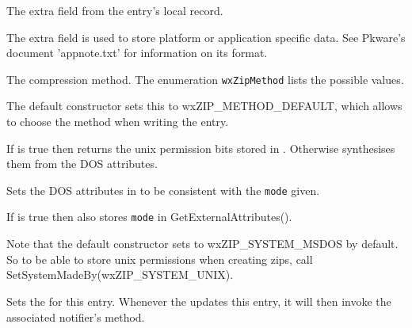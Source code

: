 


The extra field from the entry's local record.

The extra field is used to store platform or application specific
data. See Pkware's document 'appnote.txt' for information on its format.


\label{wxzipentrymethod}



The compression method. The enumeration {\tt wxZipMethod} lists the
possible values.

The default constructor sets this to wxZIP\_METHOD\_DEFAULT,
which allows  to
choose the method when writing the entry.


\label{wxzipentrymode}


If  is true then
returns the unix permission bits stored in
 .
Otherwise synthesises them from the DOS attributes.


Sets the DOS attributes
in 
to be consistent with the {\tt mode} given.

If  is true then also
stores {\tt mode} in GetExternalAttributes().

Note that the default constructor
sets  to 
wxZIP\_SYSTEM\_MSDOS by default. So to be able to store unix
permissions when creating zips, call SetSystemMadeBy(wxZIP\_SYSTEM\_UNIX).


\label{wxzipentrynotifier}



Sets the  for this entry.
Whenever the  updates
this entry, it will then invoke the associated
notifier's 
method.

